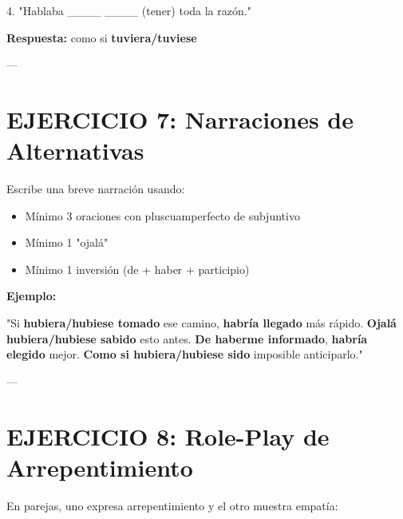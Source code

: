 \documentclass[a4paper,11pt]{article}
\begin{document}
\vspace{0.2cm}

4. "Hablaba ____ ____ (tener) toda la razón."

\textbf{Respuesta:} como si \textbf{tuviera/tuviese}

\vspace{0.2cm}

---

\vspace{0.2cm}

\section{EJERCICIO 7: Narraciones de Alternativas}

\vspace{0.2cm}

Escribe una breve narración usando:

\begin{itemize}

  \item Mínimo 3 oraciones con pluscuamperfecto de subjuntivo

  \item Mínimo 1 "ojalá"

  \item Mínimo 1 inversión (de + haber + participio)

\end{itemize}

\vspace{0.2cm}

\textbf{Ejemplo:}

"Si \textbf{hubiera/hubiese tomado} ese camino, \textbf{habría llegado} más rápido. \textbf{Ojalá hubiera/hubiese sabido} esto antes. \textbf{De haberme informado}, \textbf{habría elegido} mejor. \textbf{Como si hubiera/hubiese sido} imposible anticiparlo."

\vspace{0.2cm}

---

\vspace{0.2cm}

\section{EJERCICIO 8: Role-Play de Arrepentimiento}

\vspace{0.2cm}

En parejas, uno expresa arrepentimiento y el otro muestra empatía:
\end{document}
